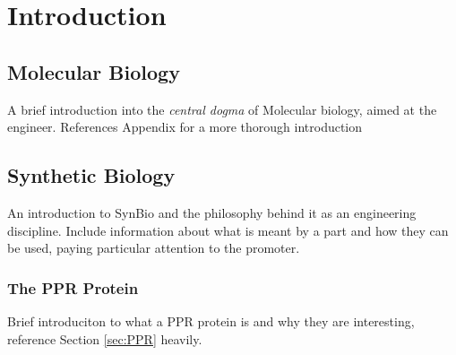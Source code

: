 
\chapter{Introduction}
\label{chap:Introduction} 

\section{Molecular Biology}
\label{sec:MolecularBiology}

A brief introduction into the \emph{central dogma} of Molecular biology, aimed 
at the engineer. 
References Appendix for a more thorough introduction

\section{Synthetic Biology}
\label{sec:synbio}

An introduction to SynBio and the philosophy behind it as an engineering
discipline. Include information about what is meant by a part and how they can
be used, paying particular attention to the promoter.

\subsection{The PPR Protein}

Brief introduciton to what a PPR protein is and why they are interesting, 
reference Section \ref{sec:PPR} heavily.

